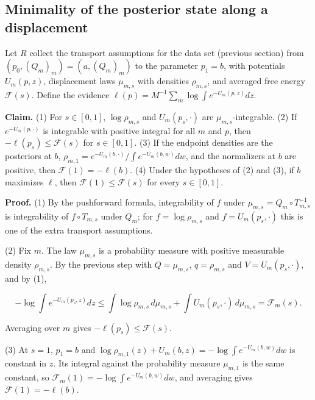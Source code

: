 \documentclass[11pt,a4paper]{report}
\begin{document}
\subsection{\texorpdfstring{Minimality of the posterior state along a displacement}{Minimality of the posterior state along a displacement}}


Let \(R\) collect the transport assumptions for the data set (previous section) from \((p_0,(Q_m)_m)=(a,(Q_m)_m)\) to the parameter \(p_1=b\), with potentials \(U_m(p,z)\), displacement laws \(\mu_{m,s}\) with densities \(\rho_{m,s}\), and averaged free energy \(\mathcal F(s)\). Define the evidence \(\ell(p)=M^{-1}\sum_m\log\int e^{-U_m(p,z)}dz\).




\textbf{Claim.} (1) For \(s\in[0,1]\), \(\log\rho_{m,s}\) and \(U_m(p_s,\cdot)\) are \(\mu_{m,s}\)-integrable. (2) If \(e^{-U_m(p,\cdot)}\) is integrable with positive integral for all \(m\) and \(p\), then \(-\ell(p_s)\le\mathcal F(s)\) for \(s\in[0,1]\). (3) If the endpoint densities are the posteriors at \(b\), \(\rho_{m,1}=e^{-U_m(b,\cdot)}/\int e^{-U_m(b,w)}dw\), and the normalizers at \(b\) are positive, then \(\mathcal F(1)=-\ell(b)\). (4) Under the hypotheses of (2) and (3), if \(b\) maximizes \(\ell\), then \(\mathcal F(1)\le\mathcal F(s)\) for every \(s\in[0,1]\).




\textbf{Proof.} (1) By the pushforward formula, integrability of \(f\) under \(\mu_{m,s}=Q_m\circ T_{m,s}^{-1}\) is integrability of \(f\circ T_{m,s}\) under \(Q_m\); for \(f=\log\rho_{m,s}\) and \(f=U_m(p_s,\cdot)\) this is one of the extra transport assumptions.




(2) Fix \(m\). The law \(\mu_{m,s}\) is a probability measure with positive measurable density \(\rho_{m,s}\). By the previous step with \(Q=\mu_{m,s}\), \(q=\rho_{m,s}\) and \(V=U_m(p_s,\cdot)\), and by (1),


\[-\log\int e^{-U_m(p_s,z)}dz\le\int\log\rho_{m,s}\,d\mu_{m,s}+\int U_m(p_s,\cdot)\,d\mu_{m,s}=\mathcal F_m(s).\]


Averaging over \(m\) gives \(-\ell(p_s)\le\mathcal F(s)\).




(3) At \(s=1\), \(p_1=b\) and \(\log\rho_{m,1}(z)+U_m(b,z)=-\log\int e^{-U_m(b,w)}dw\) is constant in \(z\). Its integral against the probability measure \(\mu_{m,1}\) is the same constant, so \(\mathcal F_m(1)=-\log\int e^{-U_m(b,w)}dw\), and averaging gives \(\mathcal F(1)=-\ell(b)\).
\end{document}
